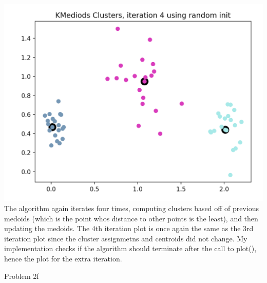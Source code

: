 \documentclass[11pt]{article}
\begin{document}
{\includegraphics[scale=0.5]{kmed-rand-iter-4.png} \newline{}
The algorithm again iterates four times, computing clusters based off of previous medoids (which is the point whos distance to other points is the least), and then updating the medoids. The 4th iteration plot is once again the same as the 3rd iteration plot since the cluster assignmetns and centroids did not change. My implementation checks if the algorithm should terminate after the call to plot(), hence the plot for the extra iteration. 
}

\item Problem 2f
\end{document}
